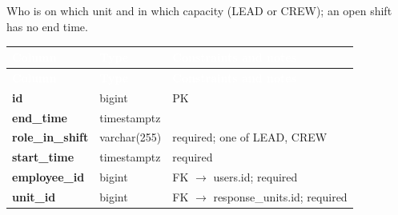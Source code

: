 \subsection*{}
Who is on which unit and in which capacity (LEAD or CREW); an open shift has no end time.\par\vspace{2pt}
{\tabfont\rowband
\begin{longtable}{@{}>{\raggedright\arraybackslash}p{}>{\raggedright\arraybackslash}p{}>{\raggedright\arraybackslash}p{}@{}}
\rowcolor{najdanavy}\textcolor{white}{\sffamily\bfseries\small Column} & \textcolor{white}{\sffamily\bfseries\small Type} & \textcolor{white}{\sffamily\bfseries\small Constraints and notes}\\
\endfirsthead
\rowcolor{najdanavy}\textcolor{white}{\sffamily\bfseries\small Column} & \textcolor{white}{\sffamily\bfseries\small Type} & \textcolor{white}{\sffamily\bfseries\small Constraints and notes}\\
\endhead
\bottomrule\endlastfoot
\textbf{id} & bigint & PK\\
\textbf{end\_\allowbreak{}time} & timestamptz & \\
\textbf{role\_\allowbreak{}in\_\allowbreak{}shift} & varchar(255) & required; one of LEAD, CREW\\
\textbf{start\_\allowbreak{}time} & timestamptz & required\\
\textbf{employee\_\allowbreak{}id} & bigint & FK $\rightarrow$ users.id; required\\
\textbf{unit\_\allowbreak{}id} & bigint & FK $\rightarrow$ response\_\allowbreak{}units.id; required\\
\end{longtable}}

